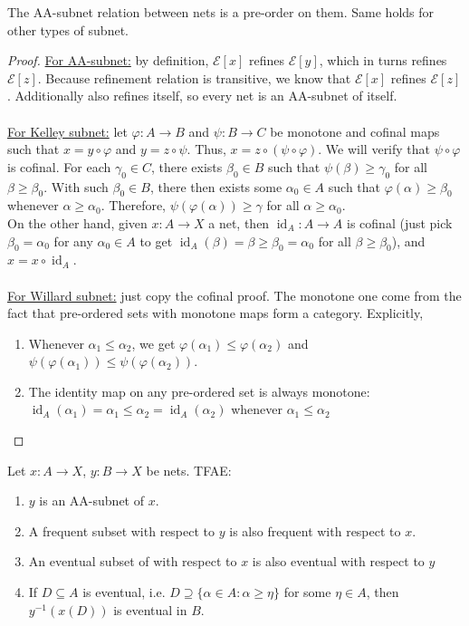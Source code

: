 \documentclass{treatise}
\begin{document}
\begin{proposition}
The AA-subnet relation between nets is a pre-order on them. Same holds for other types of subnet.
\end{proposition}
\begin{proof}
\underline{For AA-subnet:} by definition, $\mathcal{E}[x]$ refines $\mathcal{E}[y]$, which in turns refines $\mathcal{E}[z]$. Because refinement relation is transitive, we know that $\mathcal{E}[x]$ refines $\mathcal{E}[z]$. Additionally also refines itself, so every net is an AA-subnet of itself.
\\
\\
\underline{For Kelley subnet:} let $\varphi: A \to B$ and $\psi: B \to C$ be monotone and cofinal maps such that $x = y \circ \varphi$ and $y = z \circ \psi$. Thus, $x = z \circ (\psi \circ \varphi)$. We will verify that $\psi \circ \varphi$ is cofinal. For each $\gamma_0 \in C$, there exists $\beta_0 \in B$ such that $\psi(\beta) \geq \gamma_0$ for all $\beta \geq \beta_0$. With such $\beta_0 \in B$, there then exists some $\alpha_0 \in A$ such that $\varphi(\alpha) \geq \beta_0$ whenever $\alpha \geq \alpha_0$. Therefore, $\psi(\varphi(\alpha)) \geq \gamma$ for all $\alpha \geq \alpha_0$.
\\
On the other hand, given $x: A \to X$ a net, then $\operatorname{id}_A : A \to A$ is cofinal (just pick $\beta_0 = \alpha_0$ for any $\alpha_0 \in A$ to get $\operatorname{id}_A (\beta) = \beta \geq \beta_0 = \alpha_0$ for all $\beta \geq \beta_0$), and $x = x \circ \operatorname{id}_A$.
\\
\\
\underline{For Willard subnet:} just copy the cofinal proof. The monotone one come from the fact that pre-ordered sets with monotone maps form a category. Explicitly,
\begin{enumerate}
    \item Whenever $\alpha_1 \leq \alpha_2$, we get $\varphi(\alpha_1) \leq \varphi(\alpha_2)$ and $\psi(\varphi(\alpha_1)) \leq \psi(\varphi(\alpha_2))$.
    \item The identity map on any pre-ordered set is always monotone: $\operatorname{id}_A (\alpha_1) = \alpha_1 \leq \alpha_2 = \operatorname{id}_A (\alpha_2)$ whenever $\alpha_1 \leq \alpha_2$
\end{enumerate}
\end{proof}
\begin{proposition}
Let $x: A \to X$, $y: B \to X$ be nets. TFAE:
\begin{enumerate}
    \item $y$ is an AA-subnet of $x$.
    \item A frequent subset with respect to $y$ is also frequent with respect to $x$.
    \item An eventual subset of with respect to $x$ is also eventual with respect to $y$
    \item If $D \subseteq A$ is eventual, i.e. $D \supseteq \{ \alpha \in A : \alpha \geq \eta \}$ for some $\eta \in A$, then $y^{-1}(x(D))$ is eventual in $B$.
\end{enumerate}
\end{proposition}
\end{document}
